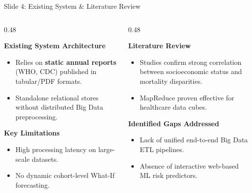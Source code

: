 \documentclass[10pt, aspectratio=169]{beamer}
\begin{document}
\begin{frame}{Slide 4: Existing System \& Literature Review}
    \begin{columns}[T]
        \begin{column}{0.48\textwidth}
            \begin{block}{\textbf{Existing System Architecture}}
                \begin{itemize}
                    \item Relies on \textbf{static annual reports} (WHO, CDC) published in tabular/PDF formats.
                    \item Standalone relational stores without distributed Big Data preprocessing.
                \end{itemize}
            \end{block}
            \vspace{0.1cm}
            \begin{alertblock}{\textbf{Key Limitations}}
                \begin{itemize}
                    \item High processing latency on large-scale datasets.
                    \item No dynamic cohort-level What-If forecasting.
                \end{itemize}
            \end{alertblock}
        \end{column}
        \begin{column}{0.48\textwidth}
            \begin{block}{\textbf{Literature Review}}
                \begin{itemize}
                    \item Studies confirm strong correlation between socioeconomic status and mortality disparities.
                    \item MapReduce proven effective for healthcare data cubes.
                \end{itemize}
            \end{block}
            \vspace{0.1cm}
            \begin{exampleblock}{\textbf{Identified Gaps Addressed}}
                \begin{itemize}
                    \item Lack of unified end-to-end Big Data ETL pipelines.
                    \item Absence of interactive web-based ML risk predictors.
                \end{itemize}
            \end{exampleblock}
        \end{column}
    \end{columns}
\end{frame}
\end{document}
